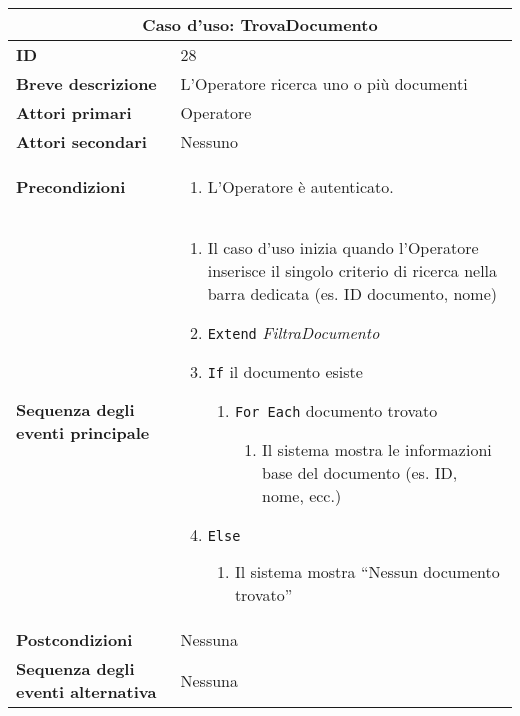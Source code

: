\documentclass[a4paper]{report}
\begin{document}
\clearpage
\begin{table}[H]
\vspace*{-0cm}
\renewcommand{\arraystretch}{1.9}
\begin{tabular}{|p{3.9cm}|p{9.9cm}|}
\hline
\multicolumn{2}{|c|}{\textbf{Caso d’uso: TrovaDocumento}} \\ \hline
	\textbf{ID} & 28 \\ \hline
	\textbf{Breve descrizione} & L’Operatore ricerca uno o più documenti \\ \hline
	\textbf{Attori primari} & Operatore \\ \hline
	\textbf{Attori secondari} & Nessuno \\ \hline
	\textbf{Precondizioni} & \begin{enumerate}[leftmargin=14pt,label=\arabic*.,labelsep=0.5em,topsep=0pt,partopsep=0pt,parsep=0pt,itemsep=0pt]
        \item L’Operatore è autenticato.
    \end{enumerate} \\ \hline
	\textbf{Sequenza degli eventi principale} & 
\begin{enumerate}[leftmargin=14pt,label=\arabic*.,labelsep=0.5em,topsep=0pt,partopsep=0pt,parsep=0pt,itemsep=0pt]
    \item Il caso d’uso inizia quando l’Operatore inserisce il singolo criterio di ricerca nella barra dedicata (es. ID documento, nome)
    \item \texttt{Extend} \textit{FiltraDocumento}
    \item \texttt{If} il documento esiste
    \begin{enumerate}[label=\arabic{enumi}.\arabic*.,leftmargin=22pt,labelsep=0.5em,topsep=0pt,partopsep=0pt,parsep=0pt,itemsep=0pt]
        \item \texttt{For Each} documento trovato
        \begin{enumerate}[label=\arabic{enumi}.\arabic{enumii}.\arabic*.,leftmargin=22pt,labelsep=0.5em,topsep=0pt,partopsep=0pt,parsep=0pt,itemsep=0pt]
            \item Il sistema mostra le informazioni base del documento (es. ID, nome, ecc.)
        \end{enumerate}
    \end{enumerate}
    \item \texttt{Else}
    \begin{enumerate}[label=\arabic{enumi}.\arabic*.,leftmargin=22pt,labelsep=0.5em,topsep=0pt,partopsep=0pt,parsep=0pt,itemsep=0pt]
        \item Il sistema mostra “Nessun documento trovato”
    \end{enumerate}
\end{enumerate}\\ \hline
	\textbf{Postcondizioni} & Nessuna \\ \hline
	\textbf{Sequenza degli eventi alternativa} & Nessuna \\ \hline
\end{tabular}
\end{table}
\end{document}
